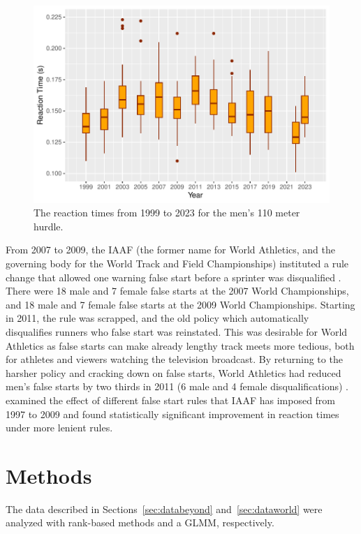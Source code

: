 \documentclass[12pt, letterpaper, titlepage]{article}
\begin{document}
\begin{figure}[tbp]
  \centering
  \includegraphics{Boxplot}
  \caption{The reaction times from 1999 to 2023 for the men's 110 meter hurdle.}
  \label{fig:Boxplot}
\end{figure}


From 2007 to 2009, the IAAF (the former name for World Athletics, and the 
governing body for the World Track and Field Championships) instituted a rule 
change that allowed one warning false start before a sprinter was disqualified 
\citep{iaaf2009falsestart}. There were 18 male and 7 female false starts at the 
2007 World Championships, and 18 male and 7 female false starts at the 2009 World 
Championships. Starting in 2011, the rule was scrapped, and the old policy which
automatically disqualifies runners who false start was reinstated. This was 
desirable for World Athletics as false starts can make already lengthy track 
meets more tedious, both for athletes and viewers watching the television 
broadcast. By returning to the harsher policy and cracking down on false starts,
World Athletics had reduced men's false starts by two thirds in 2011 (6 male and
4 female disqualifications) \citep{iaaf2009falsestart}. \citet{haugen2013effect}
examined the effect of different false start rules that IAAF has imposed from 
1997 to 2009 and found statistically significant improvement in reaction times 
under more lenient rules.



\section{Methods} \label{sec:Methods}

The data described in Sections~\ref{sec:databeyond} and~\ref{sec:dataworld} were
analyzed with rank-based methods and a GLMM, respectively.
\end{document}

